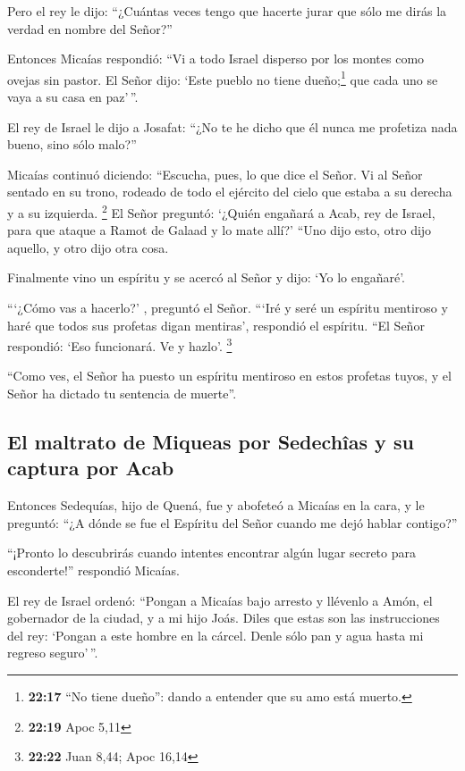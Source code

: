  Pero el rey le dijo: ``¿Cuántas veces tengo que hacerte
jurar que sólo me dirás la verdad en nombre del Señor?''

 Entonces Micaías respondió: ``Vi a todo Israel disperso
por los montes como ovejas sin pastor. El Señor dijo: `Este pueblo no
tiene dueño;\footnote{\textbf{22:17} ``No tiene dueño'': dando a
  entender que su amo está muerto.} que cada uno se vaya a su casa en
paz'\,''.

 El rey de Israel le dijo a Josafat: ``¿No te he dicho
que él nunca me profetiza nada bueno, sino sólo malo?''

 Micaías continuó diciendo: ``Escucha, pues, lo que dice
el Señor. Vi al Señor sentado en su trono, rodeado de todo el ejército
del cielo que estaba a su derecha y a su izquierda. \footnote{\textbf{22:19}
  Apoc 5,11}  El Señor preguntó: `¿Quién engañará a Acab,
rey de Israel, para que ataque a Ramot de Galaad y lo mate allí?' ``Uno
dijo esto, otro dijo aquello, y otro dijo otra cosa.

 Finalmente vino un espíritu y se acercó al Señor y dijo:
`Yo lo engañaré'.

 ```¿Cómo vas a hacerlo?' , preguntó el Señor. ```Iré y
seré un espíritu mentiroso y haré que todos sus profetas digan
mentiras', respondió el espíritu. ``El Señor respondió: `Eso funcionará.
Ve y hazlo'. \footnote{\textbf{22:22} Juan 8,44; Apoc 16,14}

 ``Como ves, el Señor ha puesto un espíritu mentiroso en
estos profetas tuyos, y el Señor ha dictado tu sentencia de muerte''.

\hypertarget{el-maltrato-de-miqueas-por-sedechuxeeas-y-su-captura-por-acab}{%
\subsection{El maltrato de Miqueas por Sedechîas y su captura por
Acab}\label{el-maltrato-de-miqueas-por-sedechuxeeas-y-su-captura-por-acab}}

 Entonces Sedequías, hijo de Quená, fue y abofeteó a
Micaías en la cara, y le preguntó: ``¿A dónde se fue el Espíritu del
Señor cuando me dejó hablar contigo?''

 ``¡Pronto lo descubrirás cuando intentes encontrar algún
lugar secreto para esconderte!'' respondió Micaías.

 El rey de Israel ordenó: ``Pongan a Micaías bajo arresto
y llévenlo a Amón, el gobernador de la ciudad, y a mi hijo Joás.
 Diles que estas son las instrucciones del rey: `Pongan a
este hombre en la cárcel. Denle sólo pan y agua hasta mi regreso
seguro'\,''.

